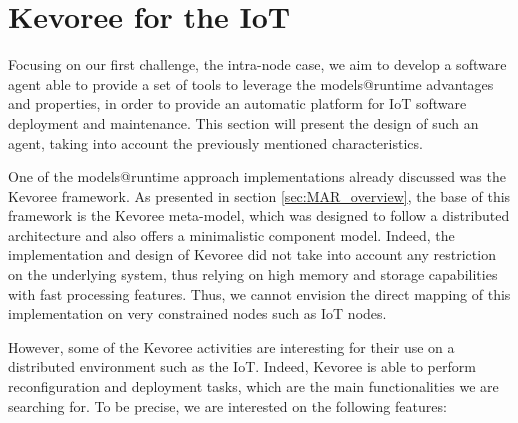 \section{Kevoree for the IoT}
\label{sec:kevAndIoT}
Focusing on our first challenge, the intra-node case, we aim to develop a software agent able to provide a set of tools to leverage the models@runtime advantages and properties, in order to provide an automatic platform for IoT software deployment and maintenance.
This section will present the design of such an agent, taking into account the previously mentioned characteristics.

One of the models@runtime approach implementations already discussed was the Kevoree framework.
As presented in section \ref{sec:MAR_overview}, the base of this framework is the Kevoree meta-model, which was designed to follow a distributed architecture and also offers a minimalistic component model.
Indeed, the implementation and design of Kevoree did not take into account any restriction on the underlying system, thus relying on high memory and storage capabilities with fast processing features.
Thus, we cannot envision the direct mapping of this implementation on very constrained nodes such as IoT nodes.

However, some of the Kevoree activities are interesting for their use on a distributed environment such as the IoT.
Indeed, Kevoree is able to perform reconfiguration and deployment tasks, which are the main functionalities we are searching for.
To be precise, we are interested on the following features:

